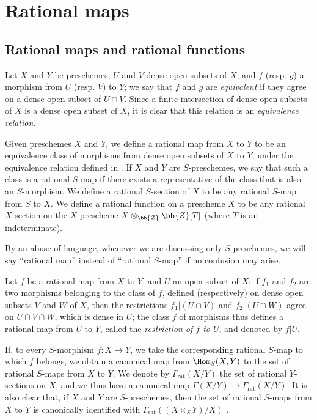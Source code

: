 \section{Rational maps}
\label{section:I.7}

\subsection{Rational maps and rational functions}
\label{subsection:I.7.1}

\begin{env}[7.1.1]
\label{I.7.1.1}
Let $X$ and $Y$ be preschemes, $U$ and $V$ dense open subsets of $X$, and $f$ (resp. $g$) a morphism from $U$ (resp. $V$) to $Y$; we say that $f$ and $g$ are \emph{equivalent} if they agree on a dense open subset of $U\cap V$.
Since a finite intersection of dense open subsets of $X$ is a dense open subset of $X$, it is clear that this relation is an \emph{equivalence relation}.
\end{env}

\begin{definition}[7.1.2]
\label{I.7.1.2}
Given preschemes $X$ and $Y$, we define a rational map from $X$ to $Y$ to be an equivalence class of morphisms from dense open subsets of $X$ to $Y$, under the equivalence relation defined in .
If $X$ and $Y$ are $S$-preschemes, we say that such a class is a rational $S$-map if there exists a representative of the class that is also an $S$-morphism.
We define a rational $S$-section of $X$ to be any rational $S$-map from $S$ to $X$.
We define a rational function on a prescheme $X$ to be any rational $X$-section on the $X$-prescheme $X\otimes_{\bb{Z}}\bb{Z}[T]$ (where $T$ is an indeterminate).

By an abuse of language, whenever we are discussing only $S$-preschemes, we will say ``rational map'' instead of ``rational $S$-map'' if no confusion may arise.

Let $f$ be a rational map from $X$ to $Y$, and $U$ an open subset of $X$; if $f_1$ and $f_2$ are two morphisms belonging to the class of $f$, defined (respectively) on dense open subsets $V$ and $W$ of $X$, then the restrictions $f_1|(U\cap V)$ and $f_2|(U\cap W)$ agree on $U\cap V\cap W$, which is dense in $U$; the class $f$ of morphisms thus defines a rational map from $U$ to $Y$, called the \emph{restriction of $f$ to $U$}, and denoted by $f|U$.

If, to every $S$-morphism $f:X\to Y$, we take the corresponding rational $S$-map to which $f$ belongs, we obtain a canonical map from $\Hom_S(X,Y)$ to the set of rational $S$-maps from $X$ to $Y$.
We denote by $\Gamma_\mathrm{rat}(X/Y)$ the set of rational $Y$-sections on $X$, and we thus have a canonical map $\Gamma(X/Y)\to\Gamma_\mathrm{rat}(X/Y)$.
It is also clear that, if $X$ and $Y$ are $S$-preschemes, then the set of rational $S$-maps from $X$ to $Y$ is canonically identified with $\Gamma_\mathrm{rat}((X\times_S Y)/X)$ .
\end{definition}

